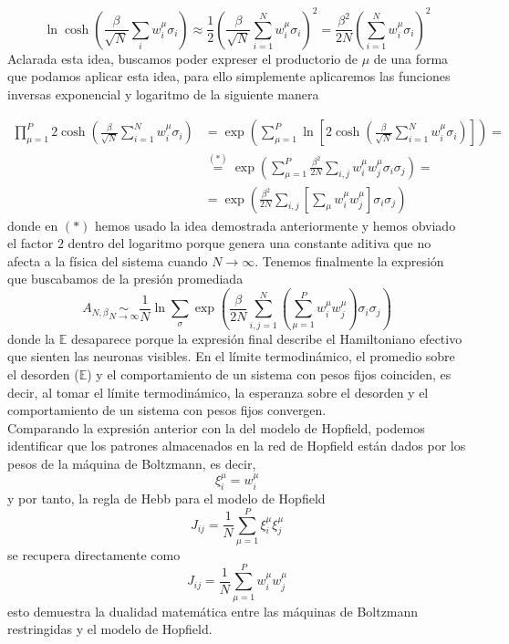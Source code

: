 \begin{equation*}
    \ln \cosh \left( \frac{\beta}{\sqrt{N}} \sum_{i} w_i^\mu \sigma_i \right) \approx \frac{1}{2} \left( \frac{\beta}{\sqrt{N}} \sum_{i=1}^N w_i^\mu \sigma_i \right)^2 = \frac{\beta^2}{2N} \left( \sum_{i=1}^N w_i^\mu \sigma_i \right)^2
\end{equation*}
Aclarada esta idea, buscamos poder expreser el productorio de $\mu$ de una forma que podamos aplicar esta idea, para ello simplemente aplicaremos las funciones inversas exponencial y logaritmo de la siguiente manera

\begin{align*}
    \prod_{\mu=1}^P 2 \cosh \left( \frac{\beta}{\sqrt{N}} \sum_{i=1}^N w_i^\mu \sigma_i \right) &= \exp \left( \sum_{\mu=1}^P \ln \left[ 2 \cosh \left( \frac{\beta}{\sqrt{N}} \sum_{i=1}^N w_i^\mu \sigma_i \right) \right] \right)=\\
    &\overset{(*)}{=} \exp \left( \sum_{\mu=1}^P \frac{\beta^2}{2N} \sum_{i,j} w_i^\mu w_j^\mu \sigma_i \sigma_j \right)=\\
    &=\exp \left( \frac{\beta^2}{2N} \sum_{i,j} \left[ \sum_{\mu} w_i^\mu w_j^\mu \right] \sigma_i \sigma_j \right)
\end{align*}
donde en $(*)$ hemos usado la idea demostrada anteriormente y hemos obviado el factor $2$ dentro del logaritmo porque genera una constante aditiva que no afecta a la física del sistema cuando $N\to \infty$. Tenemos finalmente la expresión que buscabamos de la presión promediada
\begin{equation*}
    A_{N,\beta}\underset{N \to \infty}{\sim} \frac{1}{N} \ln \sum_\sigma \exp \left( \frac{\beta}{2N} \sum_{i,j=1}^N \left(\sum_{\mu=1}^P w_i^\mu w_j^\mu \right)\sigma_i \sigma_j \right)
\end{equation*}
donde la $\mathbb{E}$ desaparece porque la expresión final describe el Hamiltoniano efectivo que sienten las neuronas visibles. En el límite termodinámico, el promedio sobre el desorden ($\mathbb{E}$) y el comportamiento de un sistema con pesos fijos coinciden, es decir, al tomar el límite termodinámico, la esperanza sobre el desorden y el comportamiento de un sistema con pesos fijos convergen. \\

\noindent
Comparando la expresión anterior con la del modelo de Hopfield, podemos identificar que los patrones almacenados en la red de Hopfield están dados por los pesos de la máquina de Boltzmann, es decir,
\begin{equation*}
    \xi_i^\mu = w_i^\mu
\end{equation*}
y por tanto, la regla de Hebb para el modelo de Hopfield
\begin{equation*}
    J_{ij} = \frac{1}{N} \sum_{\mu=1}^P \xi_i^\mu \xi_j^\mu
\end{equation*}
se recupera directamente como
\begin{equation*}
    J_{ij} = \frac{1}{N} \sum_{\mu=1}^P w_i^\mu w_j^\mu
\end{equation*}
esto demuestra la dualidad matemática entre las máquinas de Boltzmann restringidas y el modelo de Hopfield. \\

